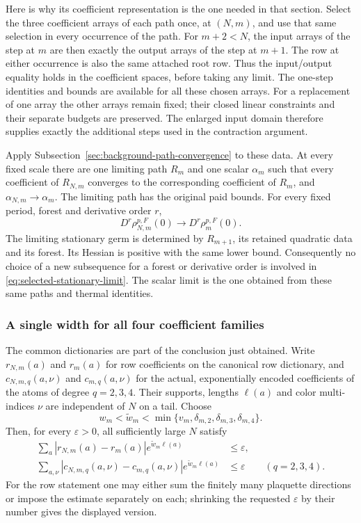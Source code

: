 Here is why its coefficient representation is the one needed in that
section. Select the three coefficient arrays of each path once, at
$(N,m)$, and use that same selection in every occurrence of the path.
For $m+2<N$, the input arrays of the step at $m$ are then exactly the
output arrays of the step at $m+1$. The row at either occurrence is
also the same attached root row. Thus the input/output equality holds
in the coefficient spaces, before taking any limit. The one-step
identities and bounds are available for all these chosen arrays.
For a replacement of one array the other arrays remain fixed; their
closed linear constraints and their separate budgets are preserved.
The enlarged input domain therefore supplies exactly the additional
steps used in the contraction argument.

Apply Subsection~\ref{sec:background-path-convergence} to these data.
At every fixed scale there are one limiting path $R_m$ and one
scalar $\alpha_m$ such that every coefficient of $R_{N,m}$ converges
to the corresponding coefficient of $R_m$, and
$\alpha_{N,m}\to\alpha_m$. The limiting path has the original paid
bounds. For every fixed period, forest and derivative order $r$,
\begin{equation}\label{eq:selected-stationary-limit}
 D^r\rho_{N,m}^{p,F}(0)\longrightarrow D^r\rho_m^{p,F}(0).
\end{equation}
The limiting stationary germ is determined by $R_{m+1}$, its retained
quadratic data and its forest. Its Hessian is positive with the same
lower bound. Consequently no choice of a new subsequence for a forest
or derivative order is involved in \eqref{eq:selected-stationary-limit}.
The scalar limit is the one obtained from these same paths and thermal
identities.

\subsubsection{A single width for all four coefficient families}
The common dictionaries are part of the conclusion just obtained.
Write $r_{N,m}(a)$ and $r_m(a)$ for row coefficients on the canonical
row dictionary, and $c_{N,m,q}(a,\nu)$ and $c_{m,q}(a,\nu)$ for the
actual, exponentially encoded coefficients of the atoms of degree
$q=2,3,4$. Their supports, lengths $\ell(a)$ and color multi-indices
$\nu$ are independent of $N$ on a tail. Choose
\[
 w_m<\widetilde w_m<
 \min\{v_m,\delta_{m,2},\delta_{m,3},\delta_{m,4}\}.
\]
Then, for every $\varepsilon>0$, all sufficiently large $N$ satisfy
\begin{align}
 \sum_a |r_{N,m}(a)-r_m(a)|e^{\widetilde w_m\ell(a)}
       &\le\varepsilon,\label{eq:selected-row-width}\\
 \sum_{a,\nu}|c_{N,m,q}(a,\nu)-c_{m,q}(a,\nu)|
                         e^{\widetilde w_m\ell(a)}
       &\le\varepsilon\qquad(q=2,3,4).
 \label{eq:selected-atom-width}
\end{align}
For the row statement one may either sum the finitely many plaquette
directions or impose the estimate separately on each; shrinking the
requested $\varepsilon$ by their number gives the displayed version.

